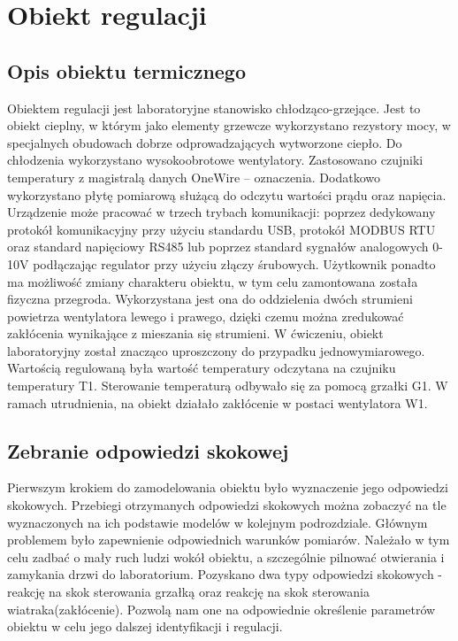 \documentclass{mwrep}
\begin{document}
\chapter{Obiekt regulacji}
\label{ObiektRegulacji}

\section{Opis obiektu termicznego}
\label{ObiektTermiczny}
Obiektem regulacji jest laboratoryjne stanowisko chłodząco-grzejące. Jest to obiekt cieplny, 
w którym jako elementy grzewcze wykorzystano rezystory mocy, w specjalnych obudowach dobrze odprowadzających
wytworzone ciepło. Do chłodzenia wykorzystano wysokoobrotowe
wentylatory. Zastosowano czujniki temperatury z magistralą danych
OneWire – oznaczenia. Dodatkowo wykorzystano płytę pomiarową
służącą do odczytu wartości prądu oraz napięcia. Urządzenie może pracować w trzech trybach komunikacji: poprzez
dedykowany protokół komunikacyjny przy użyciu standardu USB,
protokół MODBUS RTU oraz standard napięciowy RS485 lub poprzez
standard sygnałów analogowych 0-10V podłączając regulator przy użyciu złączy
śrubowych. Użytkownik ponadto ma możliwość zmiany charakteru obiektu, w tym celu
zamontowana została fizyczna przegroda. Wykorzystana jest ona do oddzielenia dwóch
strumieni powietrza wentylatora lewego i prawego, dzięki czemu można zredukować
zakłócenia wynikające z mieszania się strumieni. W ćwiczeniu, obiekt laboratoryjny
został znacząco uproszczony do przypadku jednowymiarowego. Wartością regulowaną była
wartość temperatury odczytana na czujniku temperatury T1. Sterowanie temperaturą odbywało się 
za pomocą grzałki G1. W ramach utrudnienia, na obiekt działało zakłócenie w postaci wentylatora W1.

\section{Zebranie odpowiedzi skokowej}
\label{OdpowiedzSkokowa}
Pierwszym krokiem do zamodelowania obiektu było wyznaczenie jego odpowiedzi skokowych. Przebiegi otrzymanych odpowiedzi skokowych można zobaczyć na tle wyznaczonych na ich podstawie modelów w kolejnym podrozdziale.
Głównym problemem było zapewnienie odpowiednich warunków pomiarów. Należało w tym celu zadbać o mały ruch ludzi wokół obiektu, a szczególnie pilnować otwierania i zamykania drzwi do laboratorium.
Pozyskano dwa typy odpowiedzi skokowych - reakcję na skok sterowania grzałką oraz reakcję na skok sterowania wiatraka(zakłócenie). Pozwolą nam one na odpowiednie określenie parametrów obiektu w celu jego dalszej identyfikacji i regulacji.
\end{document}
